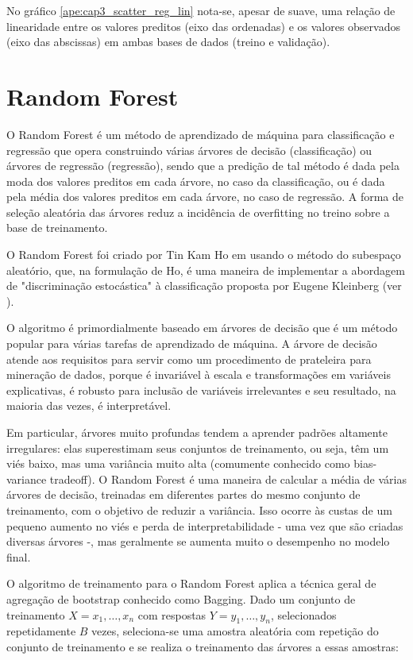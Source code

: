 No gráfico \ref{ape:cap3_scatter_reg_lin} nota-se, apesar de suave, uma relação de linearidade entre os valores preditos (eixo das ordenadas) e os valores observados (eixo das abscissas) em ambas bases de dados (treino e validação).

\section{Random Forest}
\label{sec:random_forest}

O Random Forest é um método de aprendizado de máquina para classificação e regressão que opera construindo várias árvores de decisão (classificação) ou árvores de regressão (regressão), sendo que a predição de tal método é dada pela moda dos valores preditos em cada árvore, no caso da classificação, ou é dada pela média dos valores preditos em cada árvore, no caso de regressão. A forma de seleção aleatória das árvores reduz a incidência de overfitting no treino sobre a base de treinamento.

O Random Forest foi criado por Tin Kam Ho em \citet{Ho1995} usando o método do subespaço aleatório, que, na formulação de Ho, é uma maneira de implementar a abordagem de "discriminação estocástica" à classificação proposta por Eugene Kleinberg (ver \citet{Kleinberg1990}).

O algoritmo é primordialmente baseado em árvores de decisão que é um método popular para várias tarefas de aprendizado de máquina. A árvore de decisão atende aos requisitos para servir como um procedimento de prateleira para mineração de dados, porque é invariável à escala e transformações em variáveis explicativas, é robusto para inclusão de variáveis irrelevantes e seu resultado, na maioria das vezes, é interpretável.

Em particular, árvores muito profundas tendem a aprender padrões altamente irregulares: elas superestimam seus conjuntos de treinamento, ou seja, têm um viés baixo, mas uma variância muito alta (comumente conhecido como bias-variance tradeoff). O Random Forest é uma maneira de calcular a média de várias árvores de decisão, treinadas em diferentes partes do mesmo conjunto de treinamento, com o objetivo de reduzir a variância. Isso ocorre às custas de um pequeno aumento no viés e perda de interpretabilidade - uma vez que são criadas diversas árvores -, mas geralmente se aumenta muito o desempenho no modelo final.

O algoritmo de treinamento para o Random Forest aplica a técnica geral de agregação de bootstrap conhecido como Bagging. Dado um conjunto de treinamento $ {\displaystyle X = x_{1},\ldots ,x_{n}} $ com respostas $ {\displaystyle Y = y_{1},\ldots ,y_{n}} $, selecionados repetidamente $ B $ vezes, seleciona-se uma amostra aleatória com repetição do conjunto de treinamento e se realiza o treinamento das árvores a essas amostras:

